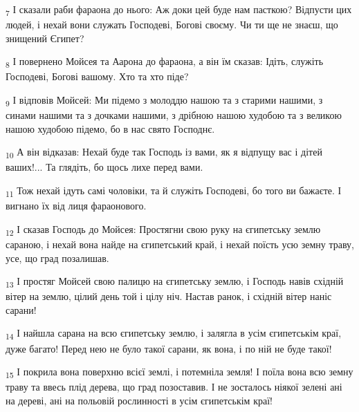 \begin{tcolorbox}
\textsubscript{7} І сказали раби фараона до нього: Аж доки цей буде нам пасткою? Відпусти цих людей, і нехай вони служать Господеві, Богові своєму. Чи ти ще не знаєш, що знищений Єгипет?
\end{tcolorbox}
\begin{tcolorbox}
\textsubscript{8} І повернено Мойсея та Аарона до фараона, а він їм сказав: Ідіть, служіть Господеві, Богові вашому. Хто та хто піде?
\end{tcolorbox}
\begin{tcolorbox}
\textsubscript{9} І відповів Мойсей: Ми підемо з молоддю нашою та з старими нашими, з синами нашими та з дочками нашими, з дрібною нашою худобою та з великою нашою худобою підемо, бо в нас свято Господнє.
\end{tcolorbox}
\begin{tcolorbox}
\textsubscript{10} А він відказав: Нехай буде так Господь із вами, як я відпущу вас і дітей ваших!... Та глядіть, бо щось лихе перед вами.
\end{tcolorbox}
\begin{tcolorbox}
\textsubscript{11} Тож нехай ідуть самі чоловіки, та й служіть Господеві, бо того ви бажаєте. І вигнано їх від лиця фараонового.
\end{tcolorbox}
\begin{tcolorbox}
\textsubscript{12} І сказав Господь до Мойсея: Простягни свою руку на єгипетську землю сараною, і нехай вона найде на єгипетський край, і нехай поїсть усю земну траву, усе, що град позалишав.
\end{tcolorbox}
\begin{tcolorbox}
\textsubscript{13} І простяг Мойсей свою палицю на єгипетську землю, і Господь навів східній вітер на землю, цілий день той і цілу ніч. Настав ранок, і східній вітер наніс сарани!
\end{tcolorbox}
\begin{tcolorbox}
\textsubscript{14} І найшла сарана на всю єгипетську землю, і залягла в усім єгипетськім краї, дуже багато! Перед нею не було такої сарани, як вона, і по ній не буде такої!
\end{tcolorbox}
\begin{tcolorbox}
\textsubscript{15} І покрила вона поверхню всієї землі, і потемніла земля! І поїла вона всю земну траву та ввесь плід дерева, що град позоставив. І не зосталось ніякої зелені ані на дереві, ані на польовій рослинності в усім єгипетськім краї!
\end{tcolorbox}
